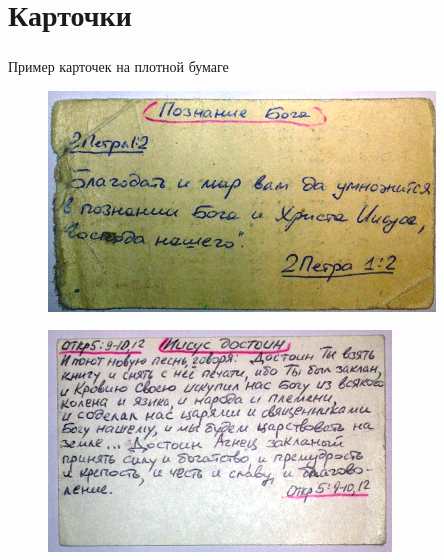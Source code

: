 \documentclass[t,aspectratio=169,14pt]{beamer}  %
\begin{document}
\section{Карточки}
\begin{frame}[c]
	\frametitle{\insertsection}
	\framesubtitle{\insertsubsection}
	Пример карточек на плотной бумаге
	 \begin{multicols*}{2}
		\begin{figure}
			\includegraphics[height=0.4\textheight]{card-2Pe_1.2}
		\end{figure}
		\begin{figure}
			\includegraphics[height=0.4\textheight]{card-Re}
		\end{figure}	
	 \end{multicols*}
\end{frame}
\end{document}
